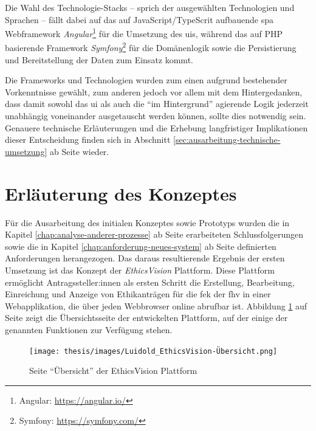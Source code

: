 \documentclass[a4paper,12pt,twoside]{scrreprt}
\begin{document}
\medskip

Die Wahl des Technologie-Stacks -- sprich der ausgewählten Technologien und Sprachen -- fällt dabei auf das auf JavaScript/TypeScrit aufbauende \ac{spa} Webframework \textit{Angular}\footnote{Angular: \url{https://angular.io/}} für die Umsetzung des \aclp{ui}, während das auf PHP basierende Framework \textit{Symfony}\footnote{Symfony: \url{https://symfony.com/}} für die Domänenlogik sowie die Persistierung und Bereitstellung der Daten zum Einsatz kommt.

Die Frameworks und Technologien wurden zum einen aufgrund bestehender Vorkenntnisse gewählt, zum anderen jedoch vor allem mit dem Hintergedanken, dass damit sowohl das \ac{ui} als auch die \enquote{im Hintergrund} agierende Logik jederzeit unabhängig voneinander ausgetauscht werden können, sollte dies notwendig sein. Genauere technische Erläuterungen und die Erhebung langfristiger Implikationen dieser Entscheidung finden sich in Abschnitt \ref{sec:ausarbeitung-technische-umsetzung} ab Seite \pageref{sec:ausarbeitung-technische-umsetzung} wieder.

\section{Erläuterung des Konzeptes}
\label{sec:erläuterung-konzept}

Für die Ausarbeitung des initialen Konzeptes sowie Prototyps wurden die in Kapitel \ref{chap:analyse-anderer-prozesse} ab Seite \pageref{chap:analyse-anderer-prozesse} erarbeiteten Schlussfolgerungen sowie die in Kapitel \ref{chap:anforderung-neues-system} ab Seite \pageref{chap:anforderung-neues-system} definierten Anforderungen herangezogen. Das daraus resultierende Ergebnis der ersten Umsetzung ist das Konzept der \textit{EthicsVision} Plattform. Diese Plattform ermöglicht Antragssteller:innen als ersten Schritt die Erstellung, Bearbeitung, Einreichung und Anzeige von Ethikanträgen für die \acl{fek} der \acl{fhv} in einer Webapplikation, die über jeden Webbrowser online abrufbar ist. Abbildung \ref{fig:ethics-vision-übersicht} auf Seite \pageref{fig:ethics-vision-übersicht} zeigt die Übersichtsseite der entwickelten Plattform, auf der einige der genannten Funktionen zur Verfügung stehen.

\begin{figure}[ht]
    \centering
    \texttt{[image: thesis/images/Luidold\_EthicsVision-Übersicht.png]}
    \caption{Seite \enquote{Übersicht} der EthicsVision Plattform}
    \label{fig:ethics-vision-übersicht}
\end{figure}
\end{document}

